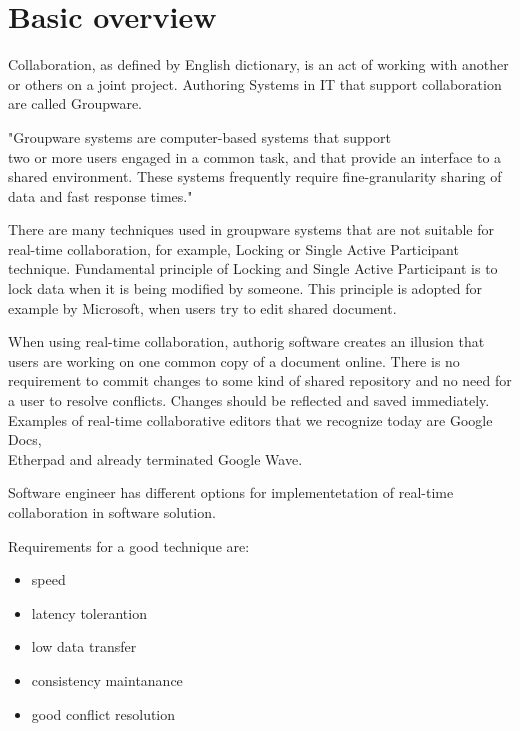 \documentclass[12pt,oneside]{fithesis2}
\begin{document}
\section{Basic overview}
Collaboration, as defined by English dictionary, is an act of working with another or others on a joint project. Authoring Systems in IT that support collaboration are called Groupware. \par "Groupware systems are computer-based systems that support \\two or more users engaged in a common task, and that provide an interface to a shared environment. These systems frequently require fine-granularity sharing of data and fast response times." \cite{Ellis} \par There are many techniques used in groupware systems that are not suitable for real-time collaboration, for example, Locking or Single Active Participant technique. Fundamental principle of Locking and Single Active Participant is to lock data when it is being modified by someone. This principle is adopted for example by Microsoft, when users try to edit shared document. \par When using real-time collaboration, authorig software creates an illusion that users are working on one common copy of a document online. There is no requirement to commit changes to some kind of shared repository and no need for a user to resolve conflicts. Changes should be reflected and saved immediately. Examples of real-time collaborative editors that we recognize today are Google Docs,\\ Etherpad and already terminated Google Wave. \par Software engineer has different options for implementetation of real-time collaboration in software solution. \par Requirements for a good technique are: 
\begin{itemize}
\item speed
\item latency tolerantion
\item low data transfer
\item consistency maintanance
\item good conflict resolution
\end{itemize}
\end{document}
